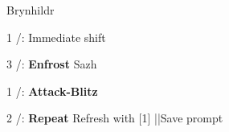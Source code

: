 \begin{mainlist}
	\item \skip
\end{mainlist}
\begin{fight}{Brynhildr}
	\item [1] \com/\rav: Immediate shift
	\item [3] \syn/\sab: \textbf{Enfrost} Sazh
	\item [1] \com/\rav: \textbf{Attack-Blitz}
	\item [2] \com/\med: \textbf{Repeat} \to Refresh with [1] ||Save prompt
\end{fight}

